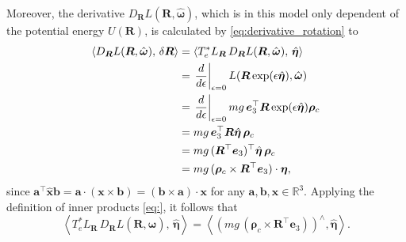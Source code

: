 \indent Moreover, the derivative $D_{\bm{R}}L(\bm{R,\hat{\bm{\omega}}})$, which is in this model only dependent of the potential energy $U(\bm{R})$, is calculated by \eqref{eq:derivative_rotation} to
\begin{align}
\left\langle D_{\bm{R}} L(\bm{R},\hat{\bm{\omega}}),\,\delta \bm{R}\right\rangle
&=
\left\langle T_{e}^{*}L_{\bm{R}}\,D_{\bm{R}} L(\bm{R},\hat{\bm{\omega}}),\, \hat{\bm{\eta}} \right\rangle \notag\\
&=
\left.\frac{d}{d\epsilon}\right|_{\epsilon=0}
L\!\left(\bm{R}\exp(\epsilon\hat{\bm{\eta}}),\hat{\bm{\omega}}\right) \notag\\
&=
\left.\frac{d}{d\epsilon}\right|_{\epsilon=0}
mg\,\bm{e}_3^{\top}\bm{R}\exp(\epsilon\hat{\bm{\eta}})\bm{\rho}_c \notag\\
&=
mg\,\bm{e}_3^{\top}\bm{R}\hat{\bm{\eta}}\,\bm{\rho}_c \notag\\
&=
mg\,(\bm{R}^{\top}\bm{e}_3)^{\top}\hat{\bm{\eta}}\,\bm{\rho}_c \notag\\
&=
mg\,(\bm{\rho}_c\times \bm{R}^{\top}\bm{e}_3)\cdot \bm{\eta}, \notag
\end{align}
since $\bm{a}^\top \hat{\bm{x}}\bm{b} = \bm{a} \cdot(\bm{x} \times \bm{b}) = (\bm{b} \times \bm{a}) \cdot \bm{x}$ for any $\bm{a}, \bm{b}, \bm{x} \in \mathbb{R}^3$. Applying the definition of inner products \eqref{eq:}, it follows that 
\begin{equation}\label{eq:continuous_3D_pendulum_derivative_rotation}
    \left\langle T_{e}^{*}L_{\bm{R}}\,D_{\bm{R}} L(\bm{R},\hat{\bm{\omega}}),\, \hat{\bm{\eta}} \right\rangle
    = \left\langle (mg\,(\bm{\rho}_c\times \bm{R}^{\top}\bm{e}_3))^\wedge, \hat{\bm{\eta}}\right\rangle.
\end{equation}


